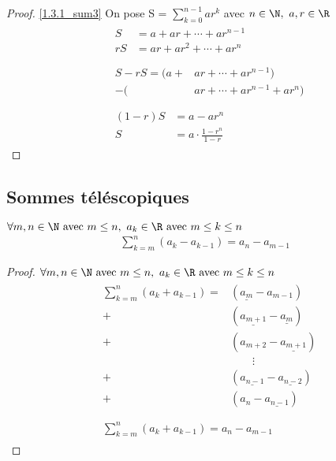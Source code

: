 \begin{proof}
	\ref{1.3.1_sum3} On pose S = $\displaystyle{\sum_{k = 0}^{n-1}ar^k}$ avec $n \in \N,\ a, r \in \R$
	\begin{align*}
		&\begin{aligned}
			S &= a + ar + \cdots + ar^{n-1} \\
			rS &= ar + ar^2 + \cdots + ar^n 
		\end{aligned} 
		\\
		\\
		&\begin{aligned}
			S - rS = (a + &ar + \cdots + ar^{n-1}) \\
			- (&ar + \cdots + ar^{n-1} + ar^n)
		\end{aligned}
		\\
		\\
		&\begin{aligned}
			(1 - r)S &= a - ar^n \\
			S &= a \cdot \frac{1 - r^n}{1 - r}
		\end{aligned}
	\end{align*}
\end{proof}

\subsection{Sommes téléscopiques}

\begin{graybox}
	\begin{proposition}
		$\forall m, n \in \N \text{ avec }m \leq n,\ a_{k}  \in \R \textnormal{ avec } m \leq k \leq n$
		\begin{align*}
			\sum_{k = m}^{n} (a_k - a_{k-1}) = a_n - a_{m - 1} 
		\end{align*}
	\end{proposition}
\end{graybox}

\begin{proof}
	$\forall m, n \in \N \text{ avec }m \leq n,\ a_{k}  \in \R \textnormal{ avec } m \leq k \leq n$
	\begin{align*}
		&\begin{aligned}
			\sum_{k = m}^{n}(a_k + a_{k - 1}) = &(\underline{a_m} - a_{m-1}) \\
			+&(\underline{a_{m+1}} - \underline{a_m}) \\
			+&(a_{m+2} - \underline{a_{m+1}}) \\
			& \qquad \vdots \\
			+& (\underline{a_{n-1}} - \underline{a_{n-2}}) \\	
			+& (a_n - \underline{a_{n - 1}}) \\
		\end{aligned}
		\\
		&\begin{aligned}
			\sum_{k = m}^{n}(a_k + a_{k - 1}) = a_n - a_{m - 1}
		\end{aligned}
	\end{align*}
\end{proof}

